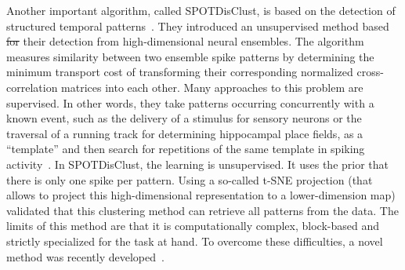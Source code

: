 \documentclass[brainsci, %
               review,accept,pdftex,moreauthors %
               ]{Definitions/mdpi}
\providecommand{\DIFadd}[1]{{\protect\color{blue}\uwave{#1}}} %
\providecommand{\DIFdel}[1]{{\protect\color{red}\sout{#1}}}                      %
\providecommand{\DIFaddbegin}{} %
\providecommand{\DIFaddend}{} %
\providecommand{\DIFdelbegin}{} %
\providecommand{\DIFdelend}{} %
\newcommand{\DIFscaledelfig}{0.5}
\newlength{\DIFdelgraphicswidth} %
\newlength{\DIFdelgraphicsheight} %
\newcommand{\DIFaddincludegraphics}[2][]{{\color{blue}\fbox{\DIFOincludegraphics[#1]{#2}}}} %
\newcommand{\DIFdelincludegraphics}[2][]{%
\sbox{\DIFdelgraphicsbox}{\DIFOincludegraphics[#1]{#2}}%
\settoboxwidth{\DIFdelgraphicswidth}{\DIFdelgraphicsbox} %
\settoboxtotalheight{\DIFdelgraphicsheight}{\DIFdelgraphicsbox} %
\scalebox{\DIFscaledelfig}{%
\parbox[b]{\DIFdelgraphicswidth}{\usebox{\DIFdelgraphicsbox}\\[-\baselineskip] \rule{\DIFdelgraphicswidth}{0em}}\llap{\resizebox{\DIFdelgraphicswidth}{\DIFdelgraphicsheight}{%
\setlength{\unitlength}{\DIFdelgraphicswidth}%
\begin{picture}(1,1)%
\thicklines\linethickness{2pt} %
{\color[rgb]{1,0,0}\put(0,0){\framebox(1,1){}}}%
{\color[rgb]{1,0,0}\put(0,0){\line( 1,1){1}}}%
{\color[rgb]{1,0,0}\put(0,1){\line(1,-1){1}}}%
\end{picture}%
}\hspace*{3pt}}} %
} %
\DeclareRobustCommand{\DIFaddbegin}{\DIFOaddbegin \let\includegraphics\DIFaddincludegraphics} %
\DeclareRobustCommand{\DIFaddend}{\DIFOaddend \let\includegraphics\DIFOincludegraphics} %
\DeclareRobustCommand{\DIFdelbegin}{\DIFOdelbegin \let\includegraphics\DIFdelincludegraphics} %
\DeclareRobustCommand{\DIFdelend}{\DIFOaddend \let\includegraphics\DIFOincludegraphics} %
\begin{document}
Another important algorithm, called SPOTDisClust, is based on the detection of structured temporal patterns~\citep{grossberger_unsupervised_2018}. They introduced an unsupervised method based \DIFdelbegin \DIFdel{for }\DIFdelend \DIFaddbegin \DIFadd{on }\DIFaddend their detection from high-dimensional neural ensembles. The algorithm measures similarity between two ensemble spike patterns by determining the minimum transport cost of transforming their corresponding normalized cross-correlation matrices into each other. Many approaches to this problem are supervised. In other words, they take patterns occurring concurrently with a known event, such as the delivery of a stimulus for sensory neurons or the traversal of a running track for determining hippocampal place fields, as a ``template'' and then search for repetitions of the same template in spiking activity~\citep{nadasdy_replay_1999,lee_combinatorial_2004}. In SPOTDisClust, the learning is unsupervised. It uses the prior that there is only one spike per pattern. Using a so-called t-SNE projection (that allows to project this high-dimensional representation to a lower-dimension map) validated that this clustering method can retrieve all patterns from the data. %
The limits of this method are that it is computationally complex, block-based and strictly specialized for the task at hand. To overcome these difficulties, a novel method was recently developed~\citep{sotomayor-gomez_spikeship_2021}.

\DIFaddbegin 


\DIFaddend %
%
\end{document}

